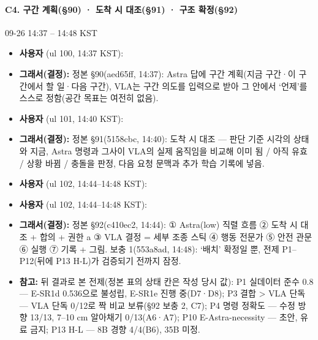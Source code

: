 \paragraph{C4. 구간 계획(§90) · 도착 시 대조(§91) · 구조 확정(§92)}
{\small 09-26 14:37 -- 14:48 KST}
\begin{itemize}
  \item \textbf{사용자} (ul 100, 14:37 KST): 
  \item \textbf{그래서(결정):} 정본 §90(aed65ff, 14:37): Astra 답에 구간 계획(지금 구간·이 구간에서 할 일·다음 구간), VLA는 구간 의도를 입력으로 받아 그 안에서 `언제'를 스스로 정함(공간 목표는 여전히 없음).
  \item \textbf{사용자} (ul 101, 14:40 KST): 
  \item \textbf{그래서(결정):} 정본 §91(5158cbc, 14:40): 도착 시 대조 --- 판단 기준 시각의 상태와 지금, Astra 명령과 그사이 VLA의 실제 움직임을 비교해 이미 됨 / 아직 유효 / 상황 바뀜 / 충돌을 판정, 다음 요청 문맥과 추가 학습 기록에 넣음.
  \item \textbf{사용자} (ul 102, 14:44--14:48 KST): 
  \item \textbf{사용자} (ul 102, 14:44--14:48 KST): 
  \item \textbf{그래서(결정):} 정본 §92(c410ec2, 14:44): ① Astra(low) 직렬 흐름 ② 도착 시 대조 + 합의 + 권한 a ③ VLA 결정 = 세부 조종 스틱 ④ 행동 전문가 ⑤ 안전 관문 ⑥ 실행 ⑦ 기록 + 그림. 보충 1(553a8ad, 14:48): `배치' 확정일 뿐, 전제 P1--P12(뒤에 P13 H-L)가 검증되기 전까지 잠정.
  \item \textbf{참고:} 뒤 결과로 본 전제(정본 표의 상태 칸은 작성 당시 값): P1 실데이터 준수 0.8 --- E-SR1d 0.536으로 불성립, E-SR1e 진행 중(D7·D8); P3 결합 > VLA 단독 --- VLA 단독 0/12로 짝 비교 보류(§92 보충 2, C7); P4 명령 정확도 --- 수정 방향 13/13, 7--10 cm 알아채기 0/13(A6·A7); P10 E-Astra-necessity --- 초안, 유료 금지; P13 H-L --- 8B 경향 4/4(B6), 35B 미정.
\end{itemize}


